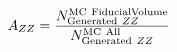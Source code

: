 \begin{equation}
A_{ZZ} = \frac{ N^{\rm MC\ Fiducial Volume}_{{\rm Generated}\ ZZ} }{ N^{{\rm MC\
All}}_{{\rm Generated}\ ZZ} }
\end{equation}



